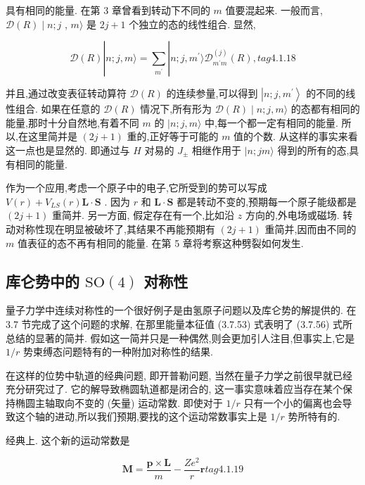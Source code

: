 具有相同的能量. 在第 3 章曾看到转动下不同的 $m$ 值要混起来. 一般而言, $\mathcal{D}\left( R\right) \mid n;j$ , $m\rangle$ 是 ${2j} + 1$ 个独立的态的线性组合. 显然,

$$
\mathcal{D}\left( R\right) \left| {n;j, m\rangle = \mathop{\sum }\limits_{{m}^{\prime }}}\right| n;j,{m}^{\prime }\rangle {\mathcal{D}}_{{m}^{\prime }m}^{\left( j\right) }\left( R\right) , tag{4.1.18}
$$

并且,通过改变表征转动算符 $\mathcal{D}\left( R\right)$ 的连续参量,可以得到 $\left| {n;j,{m}^{\prime }}\right\rangle$ 的不同的线性组合. 如果在任意的 $\mathcal{D}\left( R\right)$ 情况下,所有形为 $\mathcal{D}\left( R\right) \mid n;j, m\rangle$ 的态都有相同的能量,那时十分自然地,有着不同 $m$ 的 $|n;j, m\rangle$ 中,每一个都一定有相同的能量. 所以,在这里简并是 $\left( {{2j} + 1}\right)$ 重的,正好等于可能的 $m$ 值的个数. 从这样的事实来看这一点也是显然的. 即通过与 $H$ 对易的 ${J}_{ \pm }$ 相继作用于 $|n;{jm}\rangle$ 得到的所有的态,具有相同的能量.

作为一个应用,考虑一个原子中的电子,它所受到的势可以写成 $V\left( r\right) + {V}_{LS}\left( r\right) \mathbf{L} \cdot \mathbf{S}$ . 因为 $r$ 和 $\mathbf{L} \cdot \mathbf{S}$ 都是转动不变的,预期每一个原子能级都是 $\left( {{2j} + 1}\right)$ 重简并. 另一方面, 假定存在有一个,比如沿 $z$ 方向的,外电场或磁场. 转动对称性现在明显被破坏了,其结果不再能预期有 $\left( {{2j} + 1}\right)$ 重简并,因而由不同的 $m$ 值表征的态不再有相同的能量. 在第 5 章将考察这种劈裂如何发生.

\subsection{库仑势中的 $\mathrm{{SO}}\left( 4\right)$ 对称性}

量子力学中连续对称性的一个很好例子是由氢原子问题以及库仑势的解提供的. 在 3.7 节完成了这个问题的求解, 在那里能量本征值 (3.7.53) 式表明了 (3.7.56) 式所总结的显著的简并. 假如这一简并只是一种偶然,则会更加引人注目,但事实上,它是 $1/r$ 势束缚态问题特有的一种附加对称性的结果.

在这样的位势中轨道的经典问题, 即开普勒问题, 当然在量子力学之前很早就已经充分研究过了. 它的解导致椭圆轨道都是闭合的, 这一事实意味着应当存在某个保持椭圆主轴取向不变的 (矢量) 运动常数. 即使对于 $1/r$ 只有一个小的偏离也会导致这个轴的进动,所以我们预期,要找的这个运动常数事实上是 $1/r$ 势所特有的.

经典上. 这个新的运动常数是

$$
\mathbf{M} = \frac{\mathbf{p} \times \mathbf{L}}{m} - \frac{Z{e}^{2}}{r}\mathbf{r} tag{4.1.19}
$$

